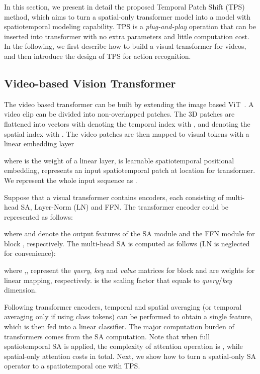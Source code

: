\documentclass[runningheads]{llncs}
\begin{document}
	In this section, we present in detail the proposed Temporal Patch Shift (TPS) method, which aims to turn a spatial-only transformer model into a model with spatiotemporal modeling capability. TPS is a \textit{plug-and-play} operation that can be inserted into transformer with no extra parameters and little computation cost. In the following, we first describe how to build a visual transformer for videos, and then introduce the design of TPS for action recognition. 
	\subsection{Video-based Vision Transformer} 	
	The video based transformer can be built by extending the image based ViT~\cite{dosovitskiy2021an}. A video clip  can be divided into  non-overlapped patches. The 3D patches are flattened into vectors  with  denoting the temporal index with , and  denoting the spatial index with . The video patches are then mapped to visual tokens with a linear embedding layer
	
	
	
	\noindent where  is the weight of a linear layer,  is learnable spatiotemporal positional embedding,  represents an input spatiotemporal patch at location  for transformer. We represent the whole input sequence as .
	
	Suppose that a visual transformer contains  encoders, each consisting of multi-head SA, Layer-Norm (LN) and FFN. The transformer encoder could be represented as follows:
	
	
	
	
	
	
	\noindent where  and  denote the output features of the SA module and the FFN module for block , respectively. The multi-head SA is computed as follows (LN is neglected for  convenience):
	
	
	
	\noindent where ,, represent the \textit{query}, \textit{key} and \textit{value} matrices for block  and  are weights for linear mapping, respectively.  is the scaling factor that equals to \textit{query}/\textit{key} dimension.
	
	Following transformer encoders, temporal and spatial averaging (or temporal averaging only if using class tokens) can be performed to obtain a single feature, which is then fed into a linear classifier. The major computation burden of transformers comes from the SA computation. Note that when full spatiotemporal SA is applied, the complexity of attention operation is , while spatial-only attention costs  in total. Next, we show how to turn a spatial-only SA operator to a spatiotemporal one with TPS.
	
\end{document}
